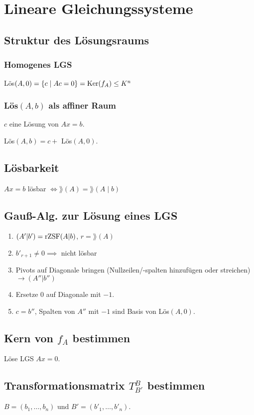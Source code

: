 \section*{Lineare Gleichungssysteme}

\subsection*{Struktur des Lösungsraums}

\subsubsection*{Homogenes LGS}
Lös$(A,0)=\{c \mid Ac=0\}=\operatorname{Ker}(f_A) \le K^n$

\subsubsection*{Lös$(A,b)$ als affiner Raum}
$c$ eine Lösung von $Ax=b$.

Lös$(A,b)=c+$ Lös$(A,0)$.

\subsection*{Lösbarkeit}
$Ax=b$ lösbar $\Leftrightarrow \rang(A) = \rang(A \mid b)$

\subsection*{Gauß-Alg. zur Lösung eines LGS}
\begin{enumerate}
	\item $(A'|b')=\operatorname{rZSF}(A|b)$, $r=\rang(A)$
	\item $b'_{r+1}\neq 0 \implies$ nicht lösbar
	\item Pivots auf Diagonale bringen (Nullzeilen/-spalten hinzufügen oder streichen) $\rightarrow (A''|b'')$
	\item Ersetze 0 auf Diagonale mit $-1$.
	\item $c=b''$, Spalten von $A''$ mit $-1$ sind Basis von Lös$(A,0)$.
\end{enumerate}

\subsection*{Kern von $f_A$ bestimmen}
Löse LGS $Ax=0$.

\subsection*{Transformationsmatrix $T_{B'}^B$ bestimmen}
$B=(b_1,\dots,b_n)$ und $B'=(b'_1,\dots,b'_n)$.

